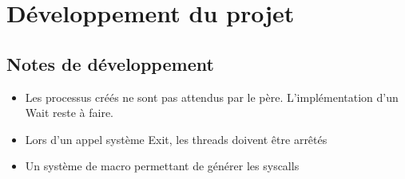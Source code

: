 \documentclass{article}
\begin{document}
\section{Développement du projet}

\subsection{Notes de développement}

\begin{itemize}
  \item Les processus créés ne sont pas attendus par le père. L'implémentation d'un Wait reste à faire.
  \item Lors d'un appel système Exit, les threads doivent être arrêtés
  \item Un système de macro permettant de générer les syscalls
\end{itemize}
\end{document}
